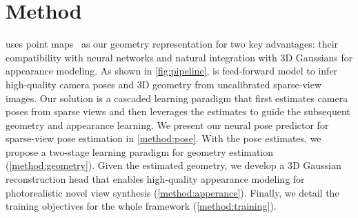 \section{Method}\label{sec::method}





\method uses point maps~\cite{wang2024dust3r} as our geometry representation for two key advantages: their compatibility with neural networks and natural integration with 3D Gaussians for appearance modeling.
%
As shown in \cref{fig:pipeline}, \method is  feed-forward model to infer high-quality camera poses and 3D geometry from uncalibrated sparse-view images.
%
Our solution is a cascaded learning paradigm that first estimates camera poses from sparse views and then leverages the estimates to guide the subsequent geometry and appearance learning.
%
We present our neural pose predictor for sparse-view pose estimation in \cref{method:pose}.
With the pose estimates, we propose a two-stage learning paradigm for geometry estimation (\cref{method:geometry}). Given the estimated geometry, we develop a 3D Gaussian reconstruction head that enables high-quality appearance modeling for photorealistic novel view synthesis (\cref{method:apperance}). Finally, we detail the training objectives for the whole framework (\cref{method:training}). 




